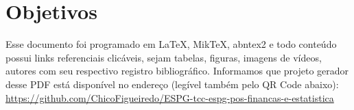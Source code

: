 \chapter{Objetivos}

Esse documento foi programado em \LaTeX, MikTeX, abntex2 e todo conteúdo possui links referenciais clicáveis, sejam tabelas, figuras, imagens de vídeos, autores com seu respectivo registro bibliográfico.
Informamos que projeto gerador desse PDF está disponível no endereço (legível também pelo QR Code abaixo): \\
\url{https://github.com/ChicoFigueiredo/ESPG-tcc-espg-pos-financas-e-estatistica} \\
\begin{center}
    \href{https://github.com/ChicoFigueiredo/ESPG-tcc-espg-pos-financas-e-estatistica'}{
    }
\end{center}

